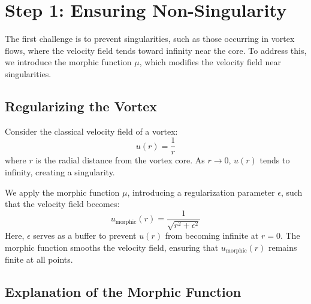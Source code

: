 \documentclass{article}
\begin{document}
\section*{Step 1: Ensuring Non-Singularity}

The first challenge is to prevent singularities, such as those occurring in vortex flows, where the velocity field tends toward infinity near the core. To address this, we introduce the morphic function \( \mu \), which modifies the velocity field near singularities.

\subsection*{Regularizing the Vortex}

Consider the classical velocity field of a vortex:
\[
u(r) = \frac{1}{r}
\]
where \( r \) is the radial distance from the vortex core. As \( r \to 0 \), \( u(r) \) tends to infinity, creating a singularity.

We apply the morphic function \( \mu \), introducing a regularization parameter \( \epsilon \), such that the velocity field becomes:
\[
u_{\text{morphic}}(r) = \frac{1}{\sqrt{r^2 + \epsilon^2}}
\]
Here, \( \epsilon \) serves as a buffer to prevent \( u(r) \) from becoming infinite at \( r = 0 \). The morphic function smooths the velocity field, ensuring that \( u_{\text{morphic}}(r) \) remains finite at all points.

\subsection*{Explanation of the Morphic Function}
\end{document}
